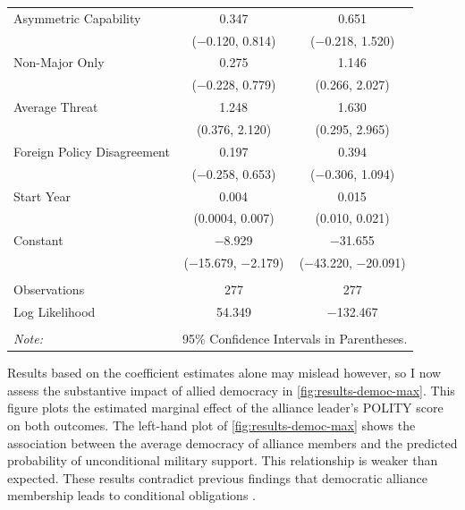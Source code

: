 \documentclass[12pt]{article}
\begin{document}
\begin{table}[!htbp]
\begin{tabular}{@{\extracolsep{5pt}}lcc}
  Asymmetric Capability & 0.347 & 0.651 \\ 
  & ($-$0.120, 0.814) & ($-$0.218, 1.520) \\ 
  Non-Major Only & 0.275 & 1.146$^{}$ \\ 
  & ($-$0.228, 0.779) & (0.266, 2.027) \\ 
  Average Threat & 1.248$^{}$ & 1.630$^{}$ \\ 
  & (0.376, 2.120) & (0.295, 2.965) \\ 
  Foreign Policy Disagreement & 0.197 & 0.394 \\ 
  & ($-$0.258, 0.653) & ($-$0.306, 1.094) \\ 
  Start Year & 0.004$^{}$ & 0.015$^{}$ \\ 
  & (0.0004, 0.007) & (0.010, 0.021) \\ 
  Constant & $-$8.929$^{}$ & $-$31.655$^{}$ \\ 
  & ($-$15.679, $-$2.179) & ($-$43.220, $-$20.091) \\ 
 \hline \\[-1.8ex] 
Observations & 277 & 277 \\ 
Log Likelihood & 54.349 & $-$132.467 \\ 
\hline 
\hline \\[-1.8ex] 
\textit{Note:}  & \multicolumn{2}{r}{95\% Confidence Intervals in Parentheses.} \\ 
\end{tabular} 
\end{table} 


Results based on the coefficient estimates alone may mislead however, so I now assess the substantive impact of allied democracy in \autoref{fig:results-democ-max}.
This figure plots the estimated marginal effect of the alliance leader's POLITY score on both outcomes. 
The left-hand plot of \autoref{fig:results-democ-max} shows the association between the average democracy of alliance members and the predicted probability of unconditional military support. 
This relationship is weaker than expected.  
These results contradict previous findings that democratic alliance membership leads to conditional obligations \citep{Mattes2012, Chibaetal2015}.
\end{document}
